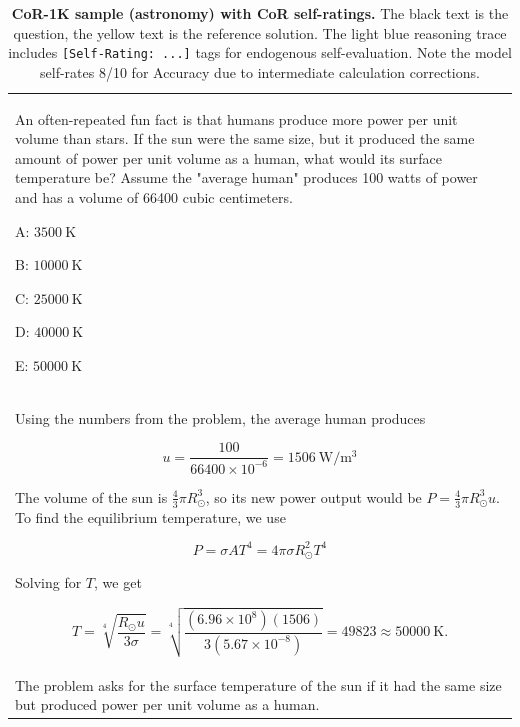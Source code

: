 \documentclass{article}
\theoremstyle{plain}
\theoremstyle{definition}
\theoremstyle{remark}
\newcommand{\data}{\textbf{CoR-1K}}
\newcommand{\defaultlightblue}[1]{{\leavevmode\color{bluec}#1}}
\newcommand{\defaultyellow}[1]{{\leavevmode\color{olmoeDarkYellow}#1}}
\begin{document}
\begin{longtable}{@{}p{\columnwidth}@{}}
\caption{{\textbf{\data{} sample (astronomy) with CoR self-ratings.} The black text is the question, the \textcolor{olmoeDarkYellow}{yellow} text is the reference solution. The \textcolor{defaultlightblue}{light blue} reasoning trace includes \texttt{[Self-Rating: ...]} tags for endogenous self-evaluation. Note the model self-rates 8/10 for Accuracy due to intermediate calculation corrections.}} \\
\toprule

An often-repeated fun fact is that humans produce more power per unit volume than stars. If the sun were the same size, but it produced the same amount of power per unit volume as a human, what would its surface temperature be? Assume the "average human" produces 100 watts of power and has a volume of 66400 cubic centimeters.

A: $3500 \mathrm{~K}$

B: $10000 \mathrm{~K}$

C: $25000 \mathrm{~K}$

D: $40000 \mathrm{~K}$

E: $50000 \mathrm{~K}$

\\

\defaultyellow{
Using the numbers from the problem, the average human produces



$$u=\frac{100}{66400 \times 10^{-6}}=1506 \mathrm{~W} / \mathrm{m}^{3}$$



The volume of the sun is $\frac{4}{3} \pi R_{\odot}^{3}$, so its new power output would be $P=\frac{4}{3} \pi R_{\odot}^{3} u$. To find the equilibrium temperature, we use



$$P=\sigma A T^{4}=4 \pi \sigma R_{\odot}^{2} T^{4}$$



Solving for $T$, we get



$$T=\sqrt[4]{\frac{R_{\odot} u}{3 \sigma}}=\sqrt[4]{\frac{\left(6.96 \times 10^{8}\right)(1506)}{3\left(5.67 \times 10^{-8}\right)}}=49823 \approx 50000 \mathrm{~K} .$$
}

\\

\defaultlightblue{
The problem asks for the surface temperature of the sun if it had the same size but produced power per unit volume as a human.



}
\end{longtable}
\end{document}
